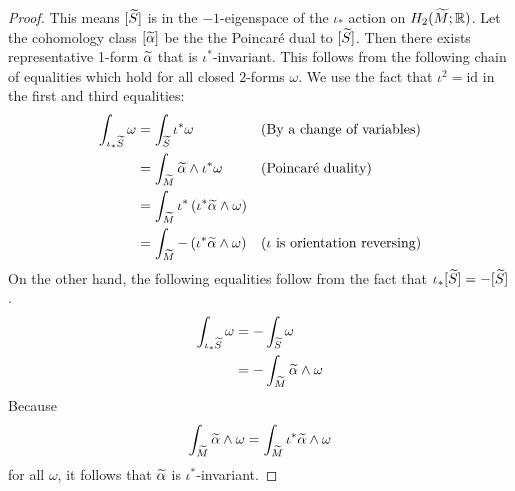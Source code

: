 \begin{proof}
  This means $[\widetilde{S}]$ is in the $-1$-eigenspace of the $\iota_{\ast}$ action on $H_2(\widetilde{M}; \mathbb{R})$.
  Let the cohomology class $[\widetilde{\alpha}]$ be the the Poincar\'e dual to $[\widetilde{S}]$.
  Then there exists representative 1-form $\widetilde{\alpha}$ that is $\iota^{\ast}$-invariant.
  This follows from the following chain of equalities which hold for all closed $2$-forms $\omega$.
  We use the fact that $\iota^2= \mathrm{id}$ in the first and third equalities:
  \begin{align*}
    \int_{\iota_{\ast}\widetilde{S}} \omega &= \int_{\widetilde{S}} \iota^{\ast}\omega &&\text{(By a change of variables)} \\
                                     &= \int_{\widetilde{M}} \widetilde{\alpha} \wedge \iota^{\ast} \omega &&\text{(Poincar\'e duality)} \\
                                     &=\int_{\widetilde{M}} \iota^{\ast} \left( \iota^{\ast}\widetilde{\alpha} \wedge \omega \right) \\
    &= \int_{\widetilde{M}} - \left( \iota^{\ast} \widetilde{\alpha} \wedge \omega \right) &&\text{($\iota$ is orientation reversing)}
  \end{align*}
  On the other hand, the following equalities follow from the fact that $\iota_{\ast}[\widetilde{S}] = -[\widetilde{S}]$.
  \begin{align*}
    \int_{\iota_{\ast}\widetilde{S}} \omega &= - \int_{\widetilde{S}} \omega \\
                              &= - \int_{\widetilde{M}} \widetilde{\alpha} \wedge \omega
  \end{align*}
  Because $$\int_{\widetilde{M}}\widetilde{\alpha}\wedge\omega=\int_{\widetilde{M}}\iota^\ast\widetilde{\alpha}\wedge\omega$$ for all $\omega$, it follows that $\widetilde{\alpha}$ is
  $\iota^{\ast}$-invariant.
\end{proof}


